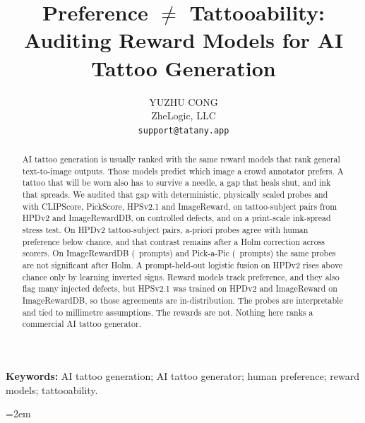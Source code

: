 \documentclass[11pt,a4paper]{article}
\title{Preference $\neq$ Tattooability: Auditing Reward Models for AI Tattoo Generation}
\author{YUZHU CONG\\
ZheLogic, LLC\\
\texttt{support@tatany.app}}
\date{}
\begin{document}
\maketitle

\begin{abstract}
AI tattoo generation is usually ranked with the same reward models that rank general text-to-image outputs.
Those models predict which image a crowd annotator prefers.
A tattoo that will be worn also has to survive a needle, a gap that heals shut, and ink that spreads.
We audited that gap with deterministic, physically scaled probes and with CLIPScore, PickScore, HPSv2.1 and ImageReward, on tattoo-subject pairs from HPDv2 and ImageRewardDB, on controlled defects, and on a print-scale ink-spread stress test.
On HPDv2 tattoo-subject pairs, a-priori probes agree with human preference below chance, and that contrast remains after a Holm correction across scorers.
On ImageRewardDB (\NIrTsprompts\ prompts) and Pick-a-Pic (\NPapTsprompts\ prompts) the same probes are not significant after Holm.
A prompt-held-out logistic fusion on HPDv2 rises above chance only by learning inverted signs.
Reward models track preference, and they also flag many injected defects, but HPSv2.1 was trained on HPDv2 and ImageReward on ImageRewardDB, so those agreements are in-distribution.
The probes are interpretable and tied to millimetre assumptions.
The rewards are not.
Nothing here ranks a commercial AI tattoo generator.
\end{abstract}
\noindent\textbf{Keywords:} AI tattoo generation; AI tattoo generator; human preference; reward models; tattooability.











\appendix



\begingroup
\footnotesize

\emergencystretch=2em

\endgroup
\end{document}

